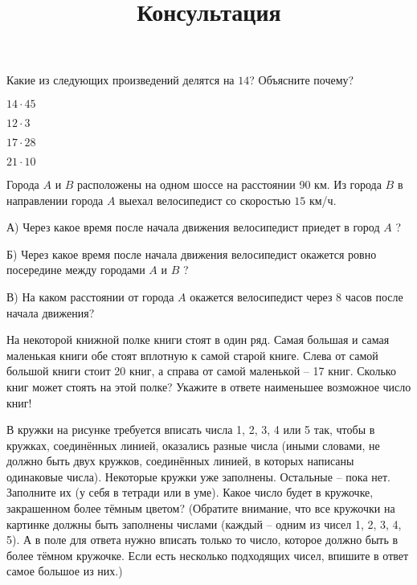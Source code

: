 \begin{class}[number=1]
\begin{listofex}
\begin{enumcols}[itemcolumns=6]
	\end{enumcols}
	\item Какие из следующих произведений делятся на \( 14 \)? Объясните почему?
	\begin{enumcols}[itemcolumns=4]
		\item \( 14\cdot45 \)
		\item \( 12\cdot3 \)
		\item \( 17\cdot28 \)
		\item \( 21\cdot10 \)
	\end{enumcols}
	\item Города \( A \) и \( B \) расположены на одном шоссе на расстоянии 90 км. Из города \( B \) в
	направлении города \( A \) выехал велосипедист со скоростью \( 15 \) км/ч.
	\begin{enumcols}[itemcolumns=1]
		\item[А)] Через какое время после начала движения велосипедист приедет в город \( A \) ?
		\item[Б)] Через какое время после начала движения велосипедист окажется ровно посередине между
		городами \( A \) и \( B \) ?
		\item[В)] На каком расстоянии от города \( A \) окажется велосипедист через 8 часов после начала
		движения?
	\end{enumcols}
\end{listofex}
\newpage
\title{Консультация}
\begin{listofex}
	\item На некоторой книжной полке книги стоят в один ряд. Самая большая и самая маленькая книги обе стоят вплотную к самой старой книге. Слева от самой большой
	книги стоит 20 книг, а справа от самой маленькой – 17 книг. Сколько книг может
	стоять на этой полке? Укажите в ответе наименьшее возможное число книг!
	\item В кружки на рисунке требуется вписать числа 1, 2, 3, 4 или 5 так, чтобы в кружках,
	соединённых линией, оказались разные числа (иными словами, не должно быть двух
	кружков, соединённых линией, в которых написаны одинаковые числа). Некоторые
	кружки уже заполнены. Остальные – пока нет. Заполните их (у себя в тетради или в
	уме). Какое число будет в кружочке, закрашенном более тёмным цветом? (Обратите
	внимание, что все кружочки на картинке должны быть заполнены числами (каждый
	– одним из чисел 1, 2, 3, 4, 5). А в поле для ответа нужно вписать только то число,
	которое должно быть в более тёмном кружочке. Если есть несколько подходящих
	чисел, впишите в ответ самое большое из них.)

\end{listofex}
\end{class}
